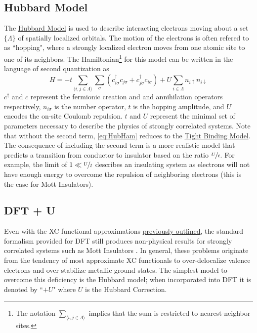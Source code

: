 \documentclass[12pt]{article}
\newcommand{\lrp}[1]{\left( #1 \right)}
\begin{document}
\subsection{Hubbard Model} %
The \href{https://en.wikipedia.org/wiki/Hubbard_model}{Hubbard Model} \cite{Hubmodel} is used to describe interacting electrons moving about a set $\{\Lambda\}$ of spatially localized orbitals. The motion of the electrons is often refered to as ``hopping", where a strongly localized electron moves from one atomic site to one of its neighbors. The Hamiltonian\footnote{The notation $\sum_{\langle i,j\in \Lambda\rangle}$ implies that the sum is restricted to nearest-neighbor sites.} for this model can be written in the language of second quantization as 
\begin{equation}\label{eq:HubHam}
    H = -t\sum_{\langle i,j\in \Lambda\rangle}\sum_{\sigma}\lrp{c^{\dagger}_{i\sigma}c_{j\sigma}+c^{\dagger}_{j\sigma}c_{i\sigma}}+U\sum_{i\in \Lambda}n_{i\uparrow}n_{i\downarrow}
\end{equation}
$c^{\dagger}$ and $c$ represent the fermionic creation and and annihilation operators respectively, $n_{i\sigma}$ is the number operator, $t$ is the hopping amplitude, and $U$ encodes the on-site Coulomb repulsion. $t$ and $U$ represent the minimal set of parameters necessary to describe the physics of strongly correlated systems. Note that without the second term,  \eqref{eq:HubHam} reduces to the \href{https://en.wikipedia.org/wiki/Tight_binding}{Tight Binding Model}. The consequence of including the second term is a more realistic model that predicts a transition from conductor to insulator based on the ratio $\nicefrac{U}{t}$. For example, the limit of $1\ll \nicefrac{U}{t}$ describes an insulating system as electrons will not have enough energy to overcome the repulsion of neighboring electrons (this is the case for Mott Insulators). 

\subsection{DFT + U} %

Even with the XC functional approximations \hyperref[sec:XCapprox]{previously outlined}, the standard formalism provided for DFT still produces non-physical results for strongly correlated systems such as Mott Insulators \cite{DFT+Ubook}. 
In general, these problems originate from the tendency of most approximate XC functionals to over-delocalize valence electrons and over-stabilize metallic ground states. The simplest model to overcome this deficiency is the Hubbard model; when incorporated into DFT it is denoted by ``$+U$" where $U$ is the Hubbard Correction.
\end{document}
